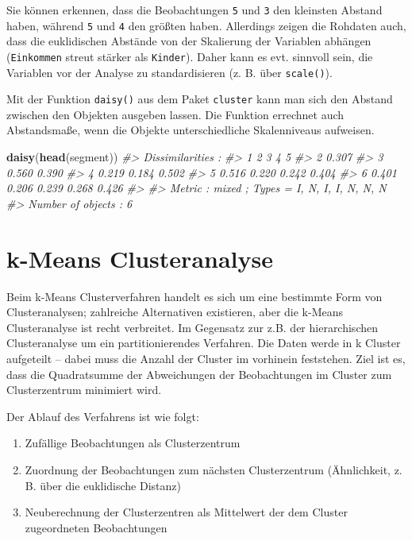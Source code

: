 \documentclass[12pt,ngerman,]{book}
\newenvironment{Shaded}{\begin{snugshade}}{\end{snugshade}}
\newcommand{\KeywordTok}[1]{\textcolor[rgb]{0.13,0.29,0.53}{\textbf{{#1}}}}
\newcommand{\CommentTok}[1]{\textcolor[rgb]{0.56,0.35,0.01}{\textit{{#1}}}}
\newcommand{\NormalTok}[1]{{#1}}
\providecommand{\tightlist}{%
  \setlength{\itemsep}{0pt}\setlength{\parskip}{0pt}}
\renewenvironment{Shaded}{\begin{kframe}}{\end{kframe}}
\begin{document}
Sie können erkennen, dass die Beobachtungen \texttt{5} und \texttt{3}
den kleinsten Abstand haben, während \texttt{5} und \texttt{4} den
größten haben. Allerdings zeigen die Rohdaten auch, dass die
euklidischen Abstände von der Skalierung der Variablen abhängen
(\texttt{Einkommen} streut stärker als \texttt{Kinder}). Daher kann es
evt. sinnvoll sein, die Variablen vor der Analyse zu standardisieren (z.
B. über \texttt{scale()}).

Mit der Funktion \texttt{daisy()} aus dem Paket \texttt{cluster} kann
man sich den Abstand zwischen den Objekten ausgeben lassen. Die Funktion
errechnet auch Abstandsmaße, wenn die Objekte unterschiedliche
Skalenniveaus aufweisen.

\begin{Shaded}
\begin{Highlighting}[]
\KeywordTok{daisy}\NormalTok{(}\KeywordTok{head}\NormalTok{(segment))}
\CommentTok{#> Dissimilarities :}
\CommentTok{#>       1     2     3     4     5}
\CommentTok{#> 2 0.307                        }
\CommentTok{#> 3 0.560 0.390                  }
\CommentTok{#> 4 0.219 0.184 0.502            }
\CommentTok{#> 5 0.516 0.220 0.242 0.404      }
\CommentTok{#> 6 0.401 0.206 0.239 0.268 0.426}
\CommentTok{#> }
\CommentTok{#> Metric :  mixed ;  Types = I, N, I, I, N, N, N }
\CommentTok{#> Number of objects : 6}
\end{Highlighting}
\end{Shaded}

\section{k-Means Clusteranalyse}\label{k-means-clusteranalyse}

Beim k-Means Clusterverfahren handelt es sich um eine bestimmte Form von
Clusteranalysen; zahlreiche Alternativen existieren, aber die k-Means
Clusteranalyse ist recht verbreitet. Im Gegensatz zur z.B. der
hierarchischen Clusteranalyse um ein partitionierendes Verfahren. Die
Daten werde in k Cluster aufgeteilt -- dabei muss die Anzahl der Cluster
im vorhinein feststehen. Ziel ist es, dass die Quadratsumme der
Abweichungen der Beobachtungen im Cluster zum Clusterzentrum minimiert
wird.

Der Ablauf des Verfahrens ist wie folgt:

\begin{enumerate}
\def\labelenumi{\arabic{enumi}.}
\tightlist
\item
  Zufällige Beobachtungen als Clusterzentrum
\item
  Zuordnung der Beobachtungen zum nächsten Clusterzentrum (Ähnlichkeit,
  z. B. über die euklidische Distanz)
\item
  Neuberechnung der Clusterzentren als Mittelwert der dem Cluster
  zugeordneten Beobachtungen
\end{enumerate}
\end{document}
